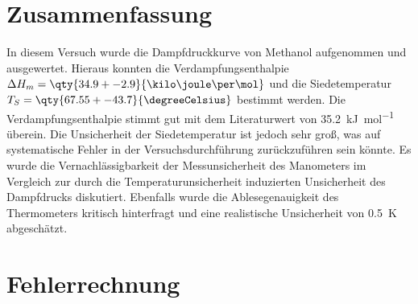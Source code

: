 \section{Zusammenfassung}
In diesem Versuch wurde die Dampfdruckkurve von Methanol aufgenommen und ausgewertet.
Hieraus konnten die Verdampfungsenthalpie $\Delta H_m = \qty{34.9 +- 2.9}{\kilo\joule\per\mol}$ und die Siedetemperatur $T_S = \qty{67.55 +- 43.7}{\degreeCelsius}$ bestimmt werden.
Die Verdampfungsenthalpie stimmt gut mit dem Literaturwert von \qty{35.2}{\kilo\joule\per\mol} überein.
Die Unsicherheit der Siedetemperatur ist jedoch sehr groß, was auf systematische Fehler in der Versuchsdurchführung zurückzuführen sein könnte.
Es wurde die Vernachlässigbarkeit der Messunsicherheit des Manometers im Vergleich zur durch die Temperaturunsicherheit induzierten Unsicherheit des Dampfdrucks diskutiert.
Ebenfalls wurde die Ablesegenauigkeit des Thermometers kritisch hinterfragt und eine realistische Unsicherheit von \qty{0.5}{\kelvin} abgeschätzt.

\newpage
\printbibliography
\newpage
\appendix

\section{Fehlerrechnung}
